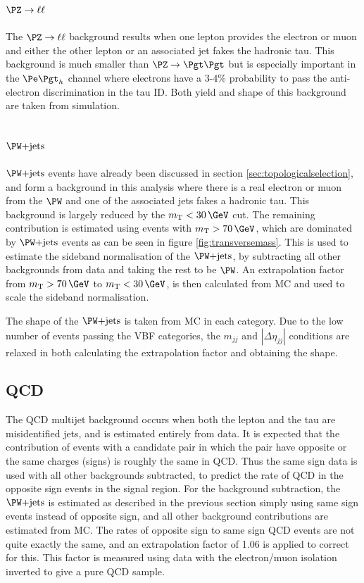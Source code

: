 \subsection{$\PZ\to\ell\ell$}
\label{sec:backgroundEstimation_Zll}

The $\PZ\to\ell\ell$ background results when one lepton provides the electron or
muon and either the other lepton or an associated jet fakes the hadronic tau. This
background is much smaller than $\ZToTauTau$ but is especially important in the
$\etau$ channel where electrons have a $3$-$4\%$ probability to pass the
anti-electron discrimination in the tau ID. Both yield and shape of this
background are taken from simulation.

\subsection{$\WJets$}
\label{sec:backgroundEstimation_WplusJets}

$\WJets$ events have already been discussed in section \ref{sec:topologicalselection},
and form a background in this analysis where there is a real electron or
muon from the $\PW$ and one of the associated jets fakes a hadronic tau. This
background is largely reduced by the $m_{\text{T}}< 30\,\GeV$ cut. 
The remaining contribution is estimated using 
events with $m_{\text{T}}> 70\,\GeV$, which are dominated by $\WJets$ 
events as can be seen in figure \ref{fig:transversemass}. 
This is used to estimate the sideband normalisation of the $\WJets$, by
subtracting all other backgrounds from data and taking the rest to be $\PW$.
An extrapolation factor from  $m_{\text{T}} > 70\,\GeV$ to $m_{\text{T}}< 30\,\GeV$, 
is then calculated from \ac{MC} and used to scale the sideband normalisation.

The shape of the $\WJets$ is taken from \ac{MC} in each category. Due to the low number of
events passing the VBF categories, the $m_{jj}$ and $|\Delta\eta_{jj}|$
conditions are relaxed in both calculating the extrapolation factor and
obtaining the shape.

\subsection{QCD}
\label{sec:backgroundEstimation_QCD}

The QCD multijet background occurs when both the lepton and the tau are misidentified jets, and is estimated 
entirely from data. It is expected that the contribution of events with a
candidate pair in which the pair have opposite or the same
charges (signs) is roughly the same in QCD. Thus the same
sign data is used with all other backgrounds subtracted, to predict the rate of
QCD in the opposite sign events in the signal region. 
For the background subtraction, the $\WJets$ is 
estimated as described in the previous section simply using same sign
events instead of opposite sign, and all other background
contributions are estimated from \ac{MC}. The rates of opposite sign to same
sign QCD events are not quite exactly the same, and an extrapolation factor of
1.06 is applied to correct for this. This factor is measured using data with the 
electron/muon isolation inverted to give a pure QCD sample. 

